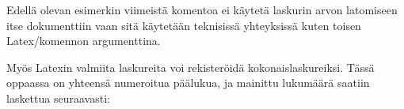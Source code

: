 Edellä olevan esimerkin viimeistä komentoa  ei
käytetä laskurin arvon latomiseen itse dokumenttiin vaan sitä käytetään
teknisissä yhteyksissä kuten toisen Latex\-/komennon argumenttina.

Myös Latexin valmiita laskureita voi rekisteröidä kokonaislaskureiksi.
Tässä oppaassa on yhteensä  numeroitua päälukua, ja
mainittu lukumäärä saatiin laskettua seuraavasti:

\begin{koodilohkosis}
\end{koodilohkosis}

